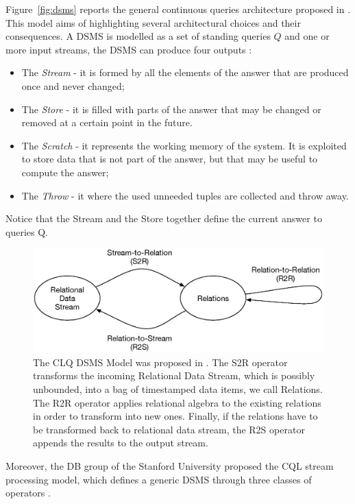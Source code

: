 Figure~\ref{fig:dsms} reports the general continuous queries architecture proposed in \cite{Babu:2001:CQO:603867.603884}. This model aims of highlighting several architectural choices and their consequences. A DSMS is modelled as a set of standing queries $Q$ and one or more input streams, the DSMS can produce four outputs \cite{Cugola:2012:PFI:2187671.2187677}:

\begin{itemize}
\item The \textit{Stream} - it is formed by all the elements of the answer that are produced once and never changed;
\item The \textit{Store} - it is filled with parts of the answer that may be changed or removed at a certain point in the future. 
\item The \textit{Scratch} - it represents the working memory of the system. It is exploited to store data that is not part of the answer, but that may be useful to compute the answer;
\item The \textit{Throw} - it where the used unneeded tuples are collected and throw away.
\end{itemize}

Notice that the Stream and the Store together define the current answer to queries Q.


\begin{figure}[tbh]
  \centering
	\includegraphics[width=\linewidth]{images/cql-model}
	\caption[CLQ DSMS Model]{The CLQ DSMS Model was proposed in \cite{Arasu2006}. The S2R operator transforms the incoming Relational Data Stream, which is possibly unbounded, into a bag of timestamped data items, we call Relations. The R2R operator applies relational algebra to the existing relations in order to transform into new ones. Finally, if the relations have to be transformed back to relational data stream, the R2S operator appends the results to the output stream.} 
  	\label{fig:cql}
\end{figure}

Moreover, the DB group of the Stanford University proposed the CQL stream processing model, which defines a generic DSMS through three classes of operators \cite{Arasu2006}.


